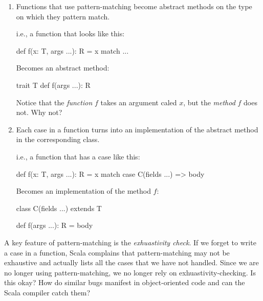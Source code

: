 \documentclass[9pt]{extbook}
\begin{document}
\begin{enumerate}

  \item Functions that use pattern-matching become abstract methods on the type
  on which they pattern match.

  i.e., a function that looks like this:

  \begin{scalacode}
  def f(x: T, args ...): R = x match { ... }
  \end{scalacode}

  Becomes an abstract method:

  \begin{scalacode}
  trait T {
    def f(args ...): R
  }
  \end{scalacode}

  \begin{think}
  Notice that the \emph{function} $f$ takes an argument caled $x$, but
  the \emph{method} $f$ does not. Why not?
  \end{think}

  \item Each case in a function turns into an implementation of the abstract
  method in the corresponding class.

  i.e., a function that has a case like this:

  \begin{scalacode}
  def f(x: T, args ...): R = x match {
    case C(fields ...) => body
  }
  \end{scalacode}

  Becomes an implementation of the method $f$:

  \begin{scalacode}
  class C(fields ...) extends T {

    def f(args ...): R = body
  }
  \end{scalacode}

\end{enumerate}

\begin{think}
A key feature of pattern-matching is the \emph{exhuastivity check}. If
we forget to write a case in a function, Scala complains that pattern-matching
may not be exhaustive and actually lists all the cases that we have not
handled. Since we are no longer using pattern-matching, we no longer rely
on exhuastivity-checking. Is this okay? How do similar bugs manifest in
object-oriented code and can the Scala compiler catch them?
\end{think}
\end{document}
